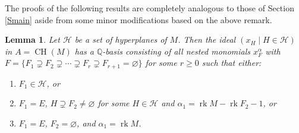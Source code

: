 \documentclass[11pt, reqno]{amsart}
\DeclareMathOperator{\aChow}{CH}             		%
\renewcommand{\emptyset}{\varnothing}
\newcommand{\QQ}{\mathbb{Q}}
\DeclareMathOperator{\rk}{rk}
\newtheorem{lemma}[thm]{Lemma}
\theoremstyle{definition}
\numberwithin{equation}{section}
\numberwithin{table}{section}
\begin{document}
\begin{spacing}{1.1}
The proofs of the following results are completely analogous to those of Section \ref{Smain} aside from some minor modifications based on the above remark.

\begin{lemma} \label{augmented:hyperplane:ideal:basis}
Let $\mathcal{H}$ be a set of hyperplanes of $M$.  Then the ideal $(x_H \mid H \in \mathcal{H})$ in $A = \aChow(M)$ has a $\QQ$-basis consisting of all nested monomials $x_F^\alpha$ with $F = \{F_1 \supsetneq F_2 \supsetneq \cdots \supsetneq F_r \supsetneq F_{r+1} = \emptyset \}$ for some $r \geq 0$ such that either: 
\begin{enumerate}[label = \textnormal{(\roman*)}]
\item $F_1 \in \mathcal{H}$, or 
\item $F_1 = E$, $H \supsetneq F_2 \neq \emptyset$ for some $H \in \mathcal{H}$ and $\alpha_1 = \rk M - \rk F_2 - 1$, or 
\item $F_1 = E$, $F_2 = \emptyset$, and $\alpha_1 = \rk M$.
\end{enumerate}
\end{lemma}



\end{spacing}
\end{document}
